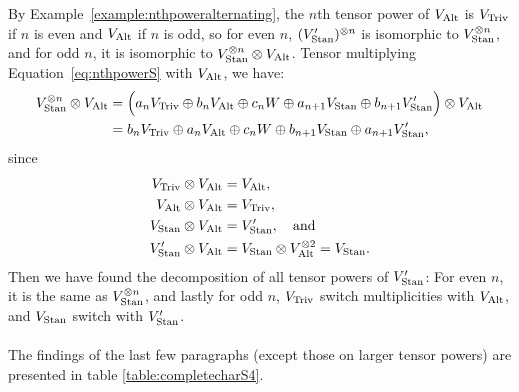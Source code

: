 {\begin{example}
	By Example~\ref{example:nthpoweralternating}, the $n$th tensor power of $V_{\text{Alt}}$ is $V_{\text{Triv}}$ if $n$ is even and $V_{\text{Alt}}$ if $n$ is odd, so for even $n$, $(V'_{\text{Stan}})^{\otimes n}$ is isomorphic to $V_{\text{Stan}}^{\otimes n}$, and for odd $n$, it is isomorphic to $ V_{\text{Stan}}^{\otimes n} \otimes V_{\text{Alt}}$. Tensor multiplying Equation~\ref{eq:nthpowerS} with $V_{\text{Alt}}$, we have:
	\begin{align*}
		V_{\text{Stan}}^{\otimes n} \otimes V_{\text{Alt}} &= \Big(a_n V_{\text{Triv}} \oplus b_n V_{\text{Alt}} \oplus c_n W \oplus a_{n+1} V_{\text{Stan}} \oplus b_{n+1} V'_{\text{Stan}}\Big)\otimes V_{\text{Alt}} \\
		&= b_n V_{\text{Triv}} \oplus a_n V_{\text{Alt}} \oplus c_n W \oplus b_{n+1} V_{\text{Stan}} \oplus a_{n+1} V'_{\text{Stan}},
	\end{align*}
	since 
	\begin{align*}
		V_{\text{Triv}} \otimes V_{\text{Alt}} &= V_{\text{Alt}}, \\
		V_{\text{Alt}} \otimes V_{\text{Alt}} &= V_{\text{Triv}}, \\
		V_{\text{Stan}} \otimes V_{\text{Alt}} &= V'_{\text{Stan}}, \quad \text{and} \\
		V'_{\text{Stan}} \otimes V_{\text{Alt}} &= V_{\text{Stan}} \otimes V_{\text{Alt}}^{\otimes 2} = V_{\text{Stan}}.
	\end{align*}
	Then we have found the decomposition of all tensor powers of $V'_{\text{Stan}}$: For even $n$, it is the same as $V_{\text{Stan}}^{\otimes n}$, and lastly for odd $n$, $V_{\text{Triv}}$ switch multiplicities with $V_{\text{Alt}}$, and $V_{\text{Stan}}$ switch with $V'_{\text{Stan}}$.
	
	\paragraph{} The findings of the last few paragraphs (except those on larger tensor powers) are presented in table \ref{table:completecharS4}.
	

\end{example}}
